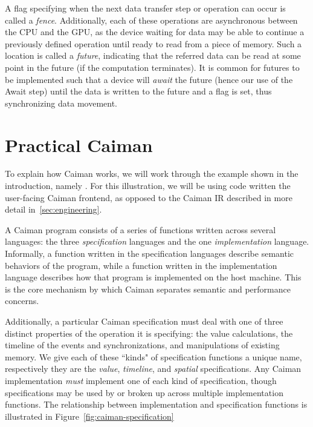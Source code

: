 A flag specifying when the next data transfer step or operation can occur is called a \emph{fence}.  Additionally, each of these operations are asynchronous between the CPU and the GPU, as the device waiting for data may be able to continue a previously defined operation until ready to read from a piece of memory.  Such a location is called a \emph{future}, indicating that the referred data can be read at some point in the future (if the computation terminates).  It is common for futures to be implemented such that a device will \emph{await} the future (hence our use of the Await step) until the data is written to the future and a flag is set, thus synchronizing data movement.

\section{Practical Caiman}
\label{sec:practical}

To explain how Caiman works, we will work through the example shown in the introduction, namely .  For this illustration, we will be using code written the user-facing Caiman frontend, as opposed to the Caiman IR described in more detail in~\ref{sec:engineering}.

A Caiman program consists of a series of functions written across several languages: the three \textit{specification} languages and the one \textit{implementation} language.  Informally, a function written in the specification languages describe semantic behaviors of the program, while a function written in the implementation language describes how that program is implemented on the host machine.  This is the core mechanism by which Caiman separates semantic and performance concerns.

Additionally, a particular Caiman specification must deal with one of three distinct properties of the operation it is specifying: the value calculations, the timeline of the events and synchronizations, and manipulations of existing memory.  We give each of these ``kinds" of specification functions a unique name, respectively they are the \textit{value}, \textit{timeline}, and \textit{spatial} specifications.  Any Caiman implementation \emph{must} implement one of each kind of specification, though specifications may be used by or broken up across multiple implementation functions.  The relationship between implementation and specification functions is illustrated in Figure~\ref{fig:caiman-specification}

